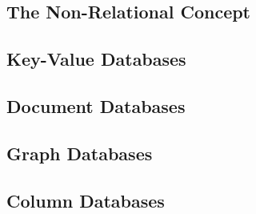 
\subsection{The Non-Relational Concept}
\label{intro-nosql-concept}

\subsection{Key-Value Databases}
\label{intro-kv-db}

\subsection{Document Databases}
\label{intro-doc-db}

\subsection{Graph Databases}
\label{intro-graph-db}

\subsection{Column Databases}
\label{intro-col-db}
